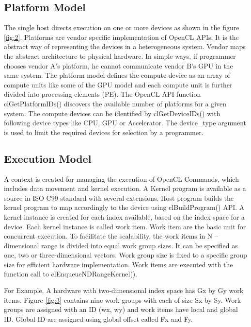 \subsection{Platform Model}
The single host directs execution on one or more devices as shown in the figure \ref{fig:2}. Platforms are vendor specific implementation of OpenCL APIs. It is the abstract way of representing the devices in a heterogeneous system. Vendor maps the abstract architecture to physical hardware. In simple ways, if programmer chooses vendor A's platform, he cannot communicate vendor B's GPU in the same system.  The platform model defines the compute device as an array of compute units like some of the GPU model and each compute unit is further divided into processing elements (PE). The OpenCL API function clGetPlatformIDs() discovers the available number of platforms for a given system. The compute devices can be identified by clGetDeviceIDs() with following device types like CPU, GPU or Accelerator. The device\_type argument is used to limit the required devices for selection by a programmer.


\subsection{Execution Model}
A context is created for managing the execution of OpenCL Commands, which includes data movement and kernel execution. A Kernel program is available as a source in ISO C99 standard with several extensions. Host program builds the kernel program to map accordingly to the device using clBuildProgram() API. A kernel instance is created for each index available, based on the index space for a device. Each kernel instance is called work item. Work item are the basic unit for concurrent execution. To facilitate the scalability, the work items in N -- dimensional range is divided into equal work group sizes. It can be specified as one, two or three-dimensional vectors. Work group size is fixed to a specific group size for efficient hardware implementation. Work items are executed with the function call to clEnqueueNDRangeKernel().


For Example, A hardware with two-dimensional index space has Gx by Gy work items. Figure \ref{fig:3} \cite{12} contains nine work groups with each of size Sx by Sy. Work-groups are assigned with an ID (wx, wy) and work items have local and global ID. Global ID are assigned using global offset called Fx and Fy. 

